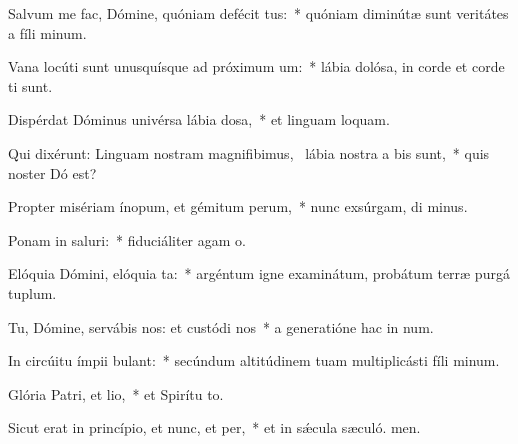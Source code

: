 \item Salvum me fac, Dómine, quóniam defécit tus:~* quóniam diminútæ sunt veritátes a fíli minum.
\item Vana locúti sunt unusquísque ad próximum um:~* lábia dolósa, in corde et corde ti sunt.
\item Dispérdat Dóminus univérsa lábia dosa,~* et linguam loquam.
\item Qui dixérunt: Linguam nostram magnifibimus,~\pscross{} lábia nostra a bis sunt,~* quis noster Dó est?
\item Propter misériam ínopum, et gémitum perum,~* nunc exsúrgam, di minus.
\item Ponam in saluri:~* fiduciáliter agam  o.
\item Elóquia Dómini, elóquia ta:~* argéntum igne examinátum, probátum terræ purgá tuplum.
\item Tu, Dómine, servábis nos: et custódi nos~* a generatióne hac in num.
\item In circúitu ímpii bulant:~* secúndum altitúdinem tuam multiplicásti fíli minum.
\item Glória Patri, et lio,~* et Spirítu to.
\item Sicut erat in princípio, et nunc, et per,~* et in sǽcula sæculó. men.
